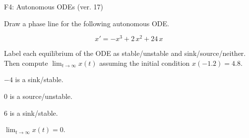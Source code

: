 \begin{exercise}
  \begin{exerciseTitle}F4: Autonomous ODEs (ver. 17)\end{exerciseTitle}
  \begin{exerciseStatement}
    

      Draw a phase line for the following 
      autonomous ODE.
    

    
\[x'= -x^{3} + 2 \, x^{2} + 24 \, x\]

    

      Label each equilibrium of the ODE
      as stable/unstable and sink/source/neither.
      Then compute \(\lim_{t\to\infty}x(t)\)
      assuming the initial condition
      \(x( -1.2 )= 4.8\).
    

  \end{exerciseStatement}
  \begin{exerciseAnswer}
    

      \(-4\) is a sink/stable.
      
        \(0\) is a source/unstable.
      
      \(6\) is a sink/stable.
    

    

      \(\lim_{t\to\infty}x(t)=0\).
    

  \end{exerciseAnswer}
\end{exercise}